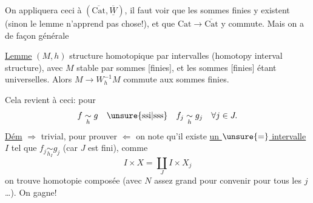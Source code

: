 On appliquera ceci à $(\overline{\mathrm{Cat}},\overline{\underline W})$, il faut voir que les sommes finies y existent (sinon le lemme n'apprend pas  chose!), et que $\mathrm{Cat}\longrightarrow\overline{\mathrm{Cat}}$ y commute.  Mais on a de façon générale

\uline{Lemme}  $(M,h)$ structure homotopique par intervalles (homotopy interval structure), avec $M$ stable par sommes [finies], et les sommes [finies] étant universelles. Alors $M\longrightarrow W_h^{-1}M$ commute aux sommes finies.


Cela revient à ceci: pour
\margin{$\vert$}
\[
f\underset h\sim g\quad\unsure{\text{ssi}|\text{sss}}\quad f_j\underset h\sim g_j\quad\forall j\in J.
\]
\uline{Dém} $\Rightarrow$ trivial, pour prouver $\Leftarrow$ on note qu'il existe \uline{un $\unsure{=}$ intervalle} $I$ tel que $f_j\underset{h_I}\sim g_j$  (car $J$ est fini),  comme
\[
I\times X=\coprod_J I\times X_j
\]
on trouve homotopie composée
(avec $N$ assez grand pour convenir pour tous les $j$\ldots). On gagne!

